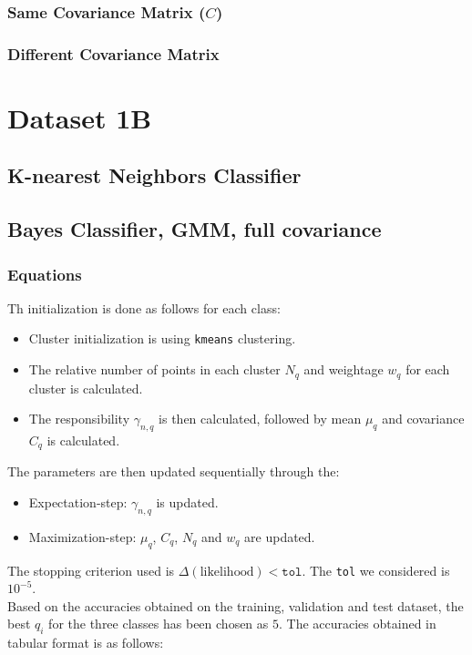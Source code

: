 \documentclass[11pt,a4paper]{article}
\newcommand{\noi}{\noindent}
\def\tt#1{\texttt{#1}}
\begin{document}
\subsubsection{Same Covariance Matrix ($C$)}
\subsubsection{Different Covariance Matrix}

\break
\section{Dataset 1B}
\subsection{K-nearest Neighbors Classifier}
\subsection{Bayes Classifier, GMM, full covariance}
\subsubsection{Equations}
Th initialization is done as follows for each class:
\begin{itemize}
    \itemsep0em
    \item Cluster initialization is using \tt{kmeans} clustering.
    \item The relative number of points in each cluster $N_q$ and weightage $w_q$ for each cluster is calculated.
    \item The responsibility $\gamma_{n,q}$ is then calculated, followed by mean $\mu_q$ and covariance $C_q$ is calculated.
\end{itemize}

\noi
The parameters are then updated sequentially through the:
\begin{itemize}
    \itemsep0em
    \item Expectation-step: $\gamma_{n,q}$ is updated.
    \item Maximization-step: $\mu_q$, $C_q$, $N_q$ and $w_q$ are updated.
\end{itemize}

\noi
The stopping criterion used is $\Delta(\text{likelihood})<\tt{tol}$. The \tt{tol} we considered is $10^{-5}$.\\

\noi
Based on the accuracies obtained on the training, validation and test dataset, the best $q_i$ for the three classes has been chosen as $5$. The accuracies obtained in tabular format is as follows:

\end{document}
